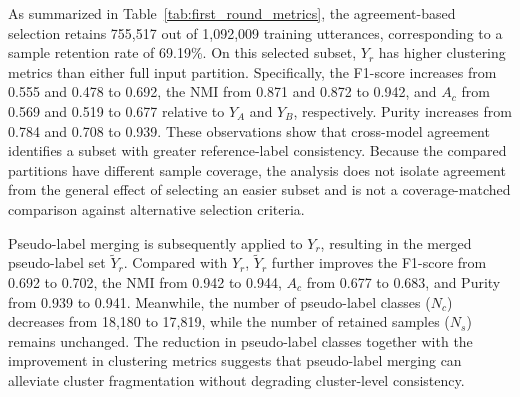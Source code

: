 \documentclass[journal]{IEEEtran}
\begin{document}
As summarized in Table~\ref{tab:first_round_metrics}, the agreement-based selection retains 755,517 out of 1,092,009 training utterances, corresponding to a sample retention rate of 69.19\%. On this selected subset, $Y_r$ has higher clustering metrics than either full input partition. Specifically, the F1-score increases from 0.555 and 0.478 to 0.692, the NMI from 0.871 and 0.872 to 0.942, and $A_c$ from 0.569 and 0.519 to 0.677 relative to $Y_A$ and $Y_B$, respectively. Purity increases from 0.784 and 0.708 to 0.939. These observations show that cross-model agreement identifies a subset with greater reference-label consistency. Because the compared partitions have different sample coverage, the analysis does not isolate agreement from the general effect of selecting an easier subset and is not a coverage-matched comparison against alternative selection criteria.

Pseudo-label merging is subsequently applied to $Y_r$, resulting in the merged pseudo-label set $\tilde{Y}_r$. Compared with $Y_r$, $\tilde{Y}_r$ further improves the F1-score from 0.692 to 0.702, the NMI from 0.942 to 0.944, $A_c$ from 0.677 to 0.683, and Purity from 0.939 to 0.941. Meanwhile, the number of pseudo-label classes ($N_c$) decreases from 18,180 to 17,819, while the number of retained samples ($N_s$) remains unchanged. The reduction in pseudo-label classes together with the improvement in clustering metrics suggests that pseudo-label merging can alleviate cluster fragmentation without degrading cluster-level consistency.
\end{document}
